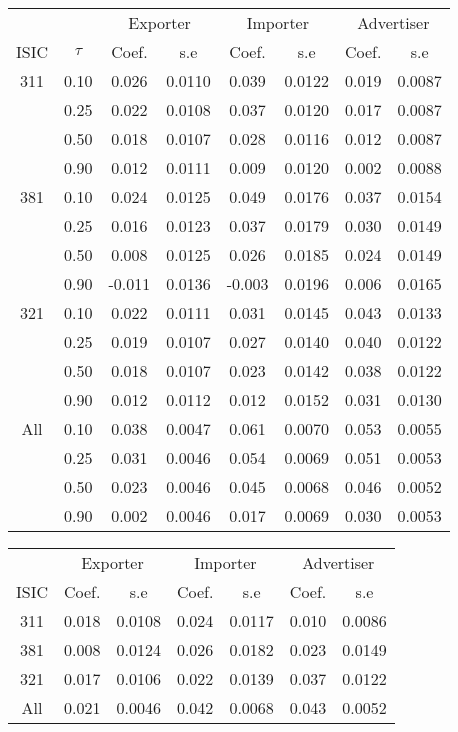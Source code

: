 \documentclass[11pt]{article}
\begin{document}
\begin{table}[H]
\centering
\begin{tabular}{cccccccc}
  \hline\hline & & \multicolumn{2}{c}{Exporter}  & \multicolumn{2}{c}{Importer} & \multicolumn{2}{c}{Advertiser} \\ \cmidrule(lr){3-4} \cmidrule(lr){5-6} \cmidrule(lr){7-8}ISIC & $\tau$ & Coef. & s.e & Coef. & s.e & Coef. & s.e \\ 
  \hline
311 & 0.10 & 0.026 & 0.0110 & 0.039 & 0.0122 & 0.019 & 0.0087 \\ 
   & 0.25 & 0.022 & 0.0108 & 0.037 & 0.0120 & 0.017 & 0.0087 \\ 
   & 0.50 & 0.018 & 0.0107 & 0.028 & 0.0116 & 0.012 & 0.0087 \\ 
   & 0.90 & 0.012 & 0.0111 & 0.009 & 0.0120 & 0.002 & 0.0088 \\ 
  381 & 0.10 & 0.024 & 0.0125 & 0.049 & 0.0176 & 0.037 & 0.0154 \\ 
   & 0.25 & 0.016 & 0.0123 & 0.037 & 0.0179 & 0.030 & 0.0149 \\ 
   & 0.50 & 0.008 & 0.0125 & 0.026 & 0.0185 & 0.024 & 0.0149 \\ 
   & 0.90 & -0.011 & 0.0136 & -0.003 & 0.0196 & 0.006 & 0.0165 \\ 
  321 & 0.10 & 0.022 & 0.0111 & 0.031 & 0.0145 & 0.043 & 0.0133 \\ 
   & 0.25 & 0.019 & 0.0107 & 0.027 & 0.0140 & 0.040 & 0.0122 \\ 
   & 0.50 & 0.018 & 0.0107 & 0.023 & 0.0142 & 0.038 & 0.0122 \\ 
   & 0.90 & 0.012 & 0.0112 & 0.012 & 0.0152 & 0.031 & 0.0130 \\ 
  All & 0.10 & 0.038 & 0.0047 & 0.061 & 0.0070 & 0.053 & 0.0055 \\ 
   & 0.25 & 0.031 & 0.0046 & 0.054 & 0.0069 & 0.051 & 0.0053 \\ 
   & 0.50 & 0.023 & 0.0046 & 0.045 & 0.0068 & 0.046 & 0.0052 \\ 
   & 0.90 & 0.002 & 0.0046 & 0.017 & 0.0069 & 0.030 & 0.0053 \\ 
   \hline
\end{tabular}
\end{table}

\begin{table}[H]
\centering
\begin{tabular}{ccccccc}
  \hline\hline & \multicolumn{2}{c}{Exporter}  & \multicolumn{2}{c}{Importer} & \multicolumn{2}{c}{Advertiser} \\ \cmidrule(lr){2-3} \cmidrule(lr){4-5} \cmidrule(lr){6-7}ISIC & Coef. & s.e & Coef. & s.e & Coef. & s.e \\ 
  \hline
311 & 0.018 & 0.0108 & 0.024 & 0.0117 & 0.010 & 0.0086 \\ 
  381 & 0.008 & 0.0124 & 0.026 & 0.0182 & 0.023 & 0.0149 \\ 
  321 & 0.017 & 0.0106 & 0.022 & 0.0139 & 0.037 & 0.0122 \\ 
  All & 0.021 & 0.0046 & 0.042 & 0.0068 & 0.043 & 0.0052 \\ 
   \hline
\end{tabular}
\end{table}
\end{document}
